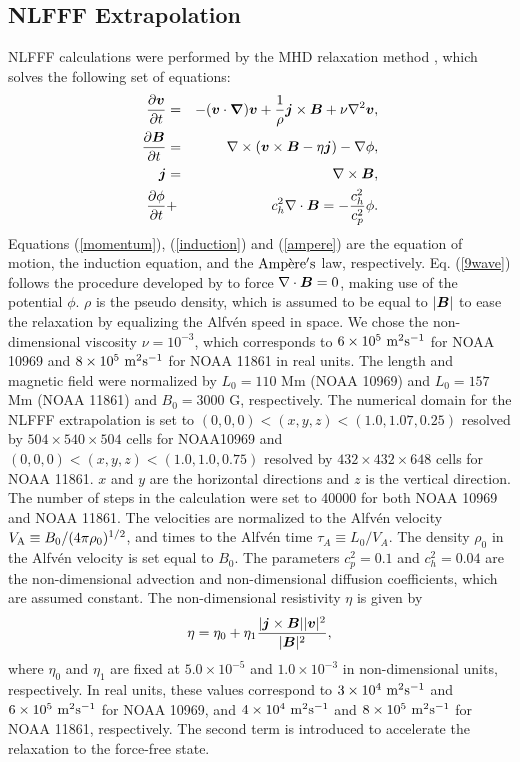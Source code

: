 \documentclass[manuscript]{aastex61}
\def\vector#1{\mbox{\boldmath $#1$}}
\begin{document}
 \subsection{NLFFF Extrapolation}
 NLFFF calculations were performed by the MHD relaxation method \citep{2014ApJ...780..101I}, which solves the
 following set of equations:
 \begin{eqnarray}
\frac{\partial \vector{v}}{\partial t}&=&-(\vector{v}\cdot \vector{\nabla})\vector{v}+\frac{1}{\rho}\vector{j}\times\vector{B}+\nu\nabla^2\vector{v}, \label{momentum} \\
\frac{\partial \vector{B}}{\partial t}&=&\nabla \times (\vector{v}\times \vector{B}-\eta \vector{j})-\nabla \phi, \label{induction}\\
\vector{j}&=& \nabla \times \vector{B}, \label{ampere}\\
\frac{\partial \phi}{\partial t} &+&c_{h}^2\nabla\cdot \vector{B}=-\frac{c_{h}^2}{c_{p}^2}\phi. \label{9wave}
\end{eqnarray}
Equations (\ref{momentum}), (\ref{induction}) and (\ref{ampere}) are the equation of motion,
the induction equation, and the ${\rm Amp\grave{e}re's}$ law, respectively. 
Eq. (\ref{9wave}) follows the procedure developed by \cite{2002JCoPh.175..645D} to force $\nabla\cdot\vector{B}=0$, making
use of the potential $\phi$. $\rho$ is the pseudo density, which is assumed to be equal to
$|\vector{B}|$ to ease the relaxation by equalizing the Alfv\'en speed in space.
 We chose the non-dimensional viscosity $\nu=10^{-3}$, which corresponds to $ 6\times10^5 \ {\rm m^2s^{-1}}$ for NOAA 10969 and $8\times10^5 \ {\rm m^2s^{-1}}$ for NOAA 11861  in real units. 
The length and magnetic field were normalized by $L_{0}=110$ Mm (NOAA 10969)
and $L_{0}=157$ Mm (NOAA 11861)  and $B_{0}=3000$ G, respectively.
The numerical domain for the NLFFF extrapolation is set to $(0,0,0) <(x,y,z)<(1.0,1.07,0.25)$ resolved by $504\times540\times504$ cells for NOAA10969 and $(0,0,0) <(x,y,z)<(1.0,1.0,0.75)$ resolved by
$432\times432\times648$ cells for NOAA 11861. 
$x$ and $y$ are the horizontal directions and $z$ is the vertical direction. 
The number of steps in the calculation were set to 40000 for both NOAA 10969 and NOAA 11861. 
The  velocities are normalized to the Alfv\'en velocity $V_{\rm A} \equiv B_0/(4\pi \rho_0)^{1/2}$, and times to the Alfv\'en time $\tau_{A} \equiv L_{0}/V_{A}$.  
The density $\rho_0$ in the Alfv\'en velocity is set equal to $B_0$.
The parameters $c_{p}^2=0.1$ and $c_{h}^2=0.04$ are the non-dimensional advection and
non-dimensional diffusion coefficients, which are assumed constant. The
non-dimensional resistivity $\eta$ is given by
\begin{equation}
\eta=\eta_{0}+\eta_{1}\frac{|\vector{j}\times\vector{B}||\vector{v}|^2}{|\vector{B}|^2},
\label{resistivity}
\end{equation}
where $\eta_{0}$ and $\eta_{1}$ are fixed at $5.0\times 10^{-5}$ and $1.0\times10^{-3}$ in non-dimensional units, respectively.  
 In real units, these values correspond to $3\times10^4 \ {\rm m^2s^{-1}}$ and $6\times10^5 \ {\rm m^2s^{-1}}$ for NOAA 10969, and $4\times10^4 \ {\rm m^2s^{-1}}$ and $8\times10^5 \ {\rm m^2s^{-1}}$ for NOAA 11861, respectively.
The second term is introduced to accelerate the relaxation to the force-free state.
\end{document}
